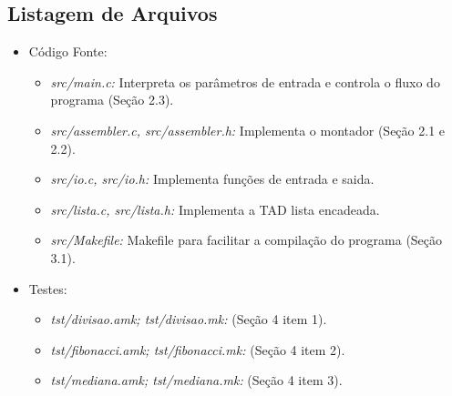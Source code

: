 \documentclass[12pt, a4paper]{article}
\begin{document}
\subsection{Listagem de Arquivos}
\begin{itemize}
	\item Código Fonte:
	\begin{itemize}
		\item \emph{src/main.c:} Interpreta os parâmetros de entrada e controla o fluxo do programa (Seção 2.3).
		\item \emph{src/assembler.c, src/assembler.h:} Implementa o montador (Seção 2.1 e 2.2).
		\item \emph{src/io.c, src/io.h:} Implementa funções de entrada e saida.
		\item \emph{src/lista.c, src/lista.h:} Implementa a TAD lista encadeada.
		\item \emph{src/Makefile:} Makefile para facilitar a compilação do programa (Seção 3.1).
	\end{itemize}
	\item Testes:
	\begin{itemize}
		\item \emph{tst/divisao.amk; tst/divisao.mk:} (Seção 4 item 1).
		\item \emph{tst/fibonacci.amk; tst/fibonacci.mk:} (Seção 4 item 2).
		\item \emph{tst/mediana.amk; tst/mediana.mk:} (Seção 4 item 3).
	\end{itemize}
	
\end{itemize}
\end{document}
